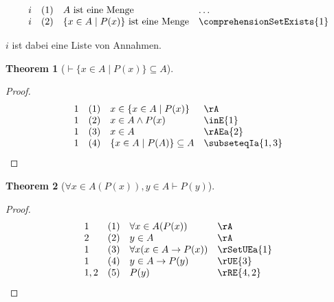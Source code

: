 \documentclass{book}
\theoremstyle{plain}
\newtheorem{theorem}{Theorem}
\theoremstyle{remark}
\theoremstyle{definition}
\begin{document}
\[
\begin{array}{llll}
	i & (1) & A \text{ ist eine Menge} & \dots  \\
	i & (2) & \{x \in A \mid P(x)\}\text{ ist eine Menge} & \comprehensionSetExists{1} \\
\end{array}
\]

\(i\) ist dabei eine Liste von Annahmen.

\label{ImpLbxInAMidPLpxRpRbSubseteqA}
\begin{theorem}[\(\vdash \{ x \in A \mid P(x) \} \subseteq A\)]
\end{theorem}

\begin{proof}
	\[
	\begin{array}{llll}
		1 & (1) & x\in \{ x \in A \mid P(x) \} & \rA \\
		1 & (2) & x\in A\land P(x) & \inE{1}\\
		1 & (3) & x\in A & \rAEa{2}\\
		1 & (4) & \{ x \in A \mid P(A) \}\subseteq A & \subseteqIa{1,3}\\
	\end{array}
	\]
\end{proof}

\label{FaxInALpPLpxRpRpwyInAImpPLpyRp}
\begin{theorem}[\(\forall x \in A(P(x)), y\in A \vdash P(y)\)]
\end{theorem}
\begin{proof}
	\[
	\begin{array}{llll}
		1 & (1) & \forall x \in A(P(x)) & \rA \\
		2 & (2) & y\in A & \rA \\
		1 & (3) & \forall x(x\in A\rightarrow P(x)) &  \rSetUEa{1} \\
		1 & (4) & y\in A\rightarrow P(y) &  \rUE{3} \\
		1,2 & (5) & P(y) &  \rRE{4,2}\\
	\end{array}
	\]
\end{proof}
\end{document}
